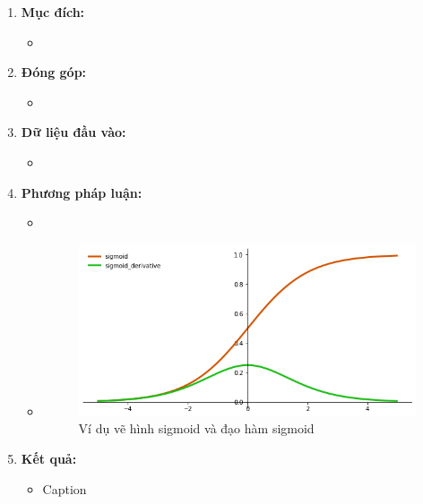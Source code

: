 \documentclass[11pt]{article}
\begin{document}
\begin{enumerate}
    \item
    \textbf{Mục đích:}
    \begin{itemize}
        \item \blindtext[0]
    \end{itemize}
    
    \item
    \textbf{Đóng góp:}
    \begin{itemize}
        \item \blindtext[0]
    \end{itemize}
    
    \item
    \textbf{Dữ liệu đầu vào:}
    \begin{itemize}
        \item \blindtext[0]
    \end{itemize}
    
    \item
    \textbf{Phương pháp luận:}
    \begin{itemize}
        \item \blindtext[0]
        \item \blindtext[0]
        \begin{figure}[!h]
            \centering
            \includegraphics[scale=0.7]{imgs/P1_sigmoid.png}
            \caption{Ví dụ vẽ hình sigmoid và đạo hàm sigmoid}
            \label{fig:P1_sig}
        \end{figure}
    \end{itemize}
    
    \item
    \textbf{Kết quả:}
    \begin{itemize}
        \item \blindtext[0]
        \begin{table}[h]
            \begin{center}
            \caption{Caption}\label{tab:2}
            

\end{center}
\end{table}
\end{itemize}
\end{enumerate}
\end{document}

